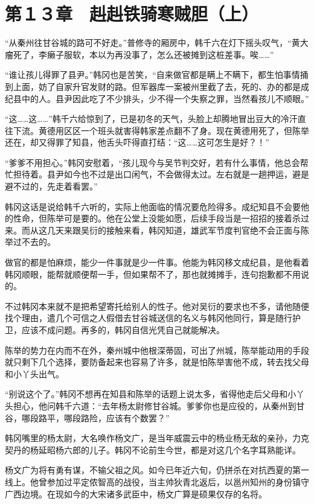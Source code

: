 \section{第１３章　赳赳铁骑寒贼胆（上）}

“从秦州往甘谷城的路可不好走。”普修寺的厢房中，韩千六在灯下摇头叹气，“黄大瘤死了，李癞子服软，本以为再没事了，怎么还被摊到这桩差事。唉……”

“谁让孩儿得罪了县尹。”韩冈也是苦笑，“自来做官都是瞒上不瞒下，都生怕事情捅到上面，妨了自家升官发财的路。但军器库一案被州里截了去，死的、办的都是成纪县中的人。县尹因此吃了不少排头，少不得一个失察之罪，当然看孩儿不顺眼。”

“这……这……”韩千六给惊到了，已是初冬的天气，头脸上却腾地冒出豆大的冷汗直往下流。黄德用区区一个班头就害得韩家差点翻不了身。现在黄德用死了，但陈举还在，却又得罪了知县，他舌头吓得直打结：“这……这可怎生是好？！”

“爹爹不用担心。”韩冈安慰着，“孩儿现今与吴节判交好，若有什么事情，他总会帮忙担待着。县尹如今也不过是出口闲气，不会做得太过。左右就是一趟押运，避是避不过的，先走着看罢。”

韩冈这话是说给韩千六听的，实际上他面临的情况要危险得多。成纪知县不会要他的性命，但陈举可是要的。他在公堂上没能如愿，后续手段当是一招招的接着杀过来。而从这几天来跟吴衍的接触来看，韩冈知道，雄武军节度判官绝不会正面与陈举过不去的。

做官的都是怕麻烦，能少一件事就是少一件事。他能为韩冈移文成纪县，是他看着韩冈顺眼，能帮就顺便帮一手，但如果帮不了，那也就摊摊手，连句抱歉都不用说的。

不过韩冈本来就不是把希望寄托给别人的性子。他对吴衍的要求也不多，请他随便找个理由，遣几个可信之人假借去甘谷城送信的名义与韩冈他同行，算是随行护卫，应该不成问题。再多的，韩冈自信光凭自己就能解决。

陈举的势力在内而不在外，秦州城中他根深蒂固，可出了州城，陈举能动用的手段就只剩下几个选择，要防备起来也容易了许多，就是怕陈举害他不成，转去找父母和小丫头出气。

“别说这个了。”韩冈不想再在知县和陈举的话题上说太多，省得他走后父母和小丫头担心，他问韩千六道：“去年杨太尉修甘谷城。爹爹你也是应役的，从秦州到甘谷，哪段路平，哪段路险，应该有个数罢？”

韩冈嘴里的杨太尉，大名唤作杨文广，是当年威震云中的杨业杨无敌的亲孙，力克契丹的杨延昭杨六郎的儿子。韩冈不论前生今世，都是对这几个名字耳熟能详。

杨文广为将有勇有谋，不输父祖之风。如今已年近六旬，仍拼杀在对抗西夏的第一线上。他曾参加过平定侬智高的战役，当主帅狄青北返后，以邕州知州的身份镇守广西边境。在现如今的大宋诸多武臣中，杨文广算是硕果仅存的名将。


